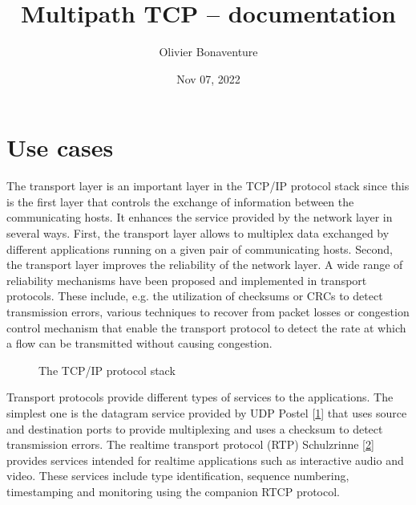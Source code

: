 \documentclass[letterpaper,10pt,english]{sphinxmanual}
\title{Multipath TCP -- documentation}
\date{Nov 07, 2022}
\author{Olivier Bonaventure}
\begin{document}
\pagestyle{empty}
\sphinxmaketitle
\pagestyle{plain}
\sphinxtableofcontents
\pagestyle{normal}
\label{\detokenize{index::doc}}



\chapter{Use cases}
\label{\detokenize{usecases:use-cases}}\label{\detokenize{usecases::doc}}
\sphinxAtStartPar
The transport layer is an important layer in the TCP/IP protocol stack since this is the first layer that controls the exchange of information between the communicating hosts. It enhances the service provided by the network layer in several ways. First, the transport layer allows to multiplex data exchanged by different applications running on a given pair of communicating hosts. Second, the transport layer improves the reliability of the network layer. A wide range of reliability mechanisms have been proposed and implemented in transport protocols. These include, e.g. the utilization of checksums or CRCs to detect transmission errors, various techniques to recover from packet losses or congestion control mechanism that enable the transport protocol to detect the rate at which a flow can be transmitted without causing congestion.
\begin{figure}[htbp]\centering\capstart{}\caption{The TCP/IP protocol stack}\label{\detokenize{usecases:id23}}\label{\detokenize{usecases:fig-layers}}\end{figure}
\sphinxAtStartPar
Transport protocols provide different types of services to the applications. The simplest one is the datagram service provided by UDP Postel {[}\hyperlink{cite.biblio:id704}{1}{]} that uses source and destination ports to provide multiplexing and uses a checksum to detect transmission errors.
The real\sphinxhyphen{}time transport protocol (RTP) Schulzrinne  {[}\hyperlink{cite.biblio:id3471}{2}{]} provides services intended for real\sphinxhyphen{}time applications such as interactive audio and video. These services include type identification, sequence numbering, timestamping and monitoring using the companion RTCP protocol.
\end{document}

